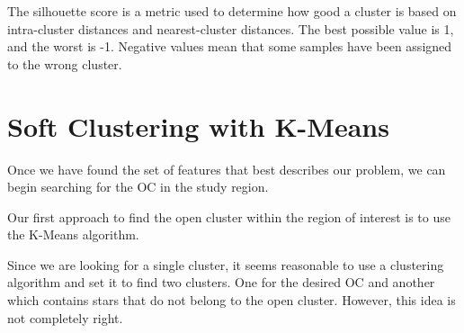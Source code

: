 \documentclass[11pt, a4paper, english]{book}
\begin{document}
The silhouette score is a metric used to determine how good a cluster is based on intra-cluster distances and nearest-cluster distances.
The best possible value is 1, and the worst is -1. Negative values mean that some samples have been assigned to the wrong cluster.

\section{Soft Clustering with K-Means}

Once we have found the set of features that best describes our problem, we can begin searching for the OC in the study region.

Our first approach to find the open cluster within the region of interest is to use the K-Means algorithm.

Since we are looking for a single cluster, it seems reasonable to use a clustering algorithm and set it to find two clusters.
One for the desired OC and another which contains stars that do not belong to the open cluster.
However, this idea is not completely right.
\end{document}
